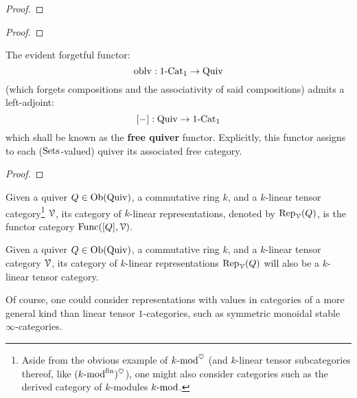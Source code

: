                 \begin{proof}
                    
                \end{proof}
            \begin{definition}
                
            \end{definition}
            \begin{proposition} \label{prop: separatedness_criterion_for_quivers}
                
            \end{proposition}
                \begin{proof}
                    
                \end{proof}
                
            \begin{proposition} \label{prop: free_quivers}
                The evident forgetful functor:
                    $$\oblv: 1\-\Cat_1 \to \Quiv$$
                (which forgets compositions and the associativity of said compositions) admits a left-adjoint:
                    $$[-]: \Quiv \to 1\-\Cat_1$$
                which shall be known as the \textbf{free quiver} functor. Explicitly, this functor assigns to each ($\Sets$-valued) quiver its associated free category.
            \end{proposition}
                \begin{proof}
                    
                \end{proof}
            \begin{definition} \label{def: quiver_representations}
                Given a quiver $Q \in \Ob(\Quiv)$, a commutative ring $k$, and a $k$-linear tensor category\footnote{Aside from the obvious example of $k\mod^{\heart}$ (and $k$-linear tensor subcategories thereof, like $(k\mod^{\fin})^{\heart}$), one might also consider categories such as the derived category of $k$-modules $k\mod$.} $\calV$, its category of $k$-linear representations, denoted by $\Rep_{\calV}(Q)$, is the functor category $\Func([Q], \calV)$.
            \end{definition}
            \begin{remark}
                Given a quiver $Q \in \Ob(\Quiv)$, a commutative ring $k$, and a $k$-linear tensor category $\calV$, its category of $k$-linear representations $\Rep_{\calV}(Q)$ will also be a $k$-linear tensor category.
                
                Of course, one could consider representations with values in categories of a more general kind than linear tensor $1$-categories, such as symmetric monoidal stable $\infty$-categories. 
            \end{remark}
            
